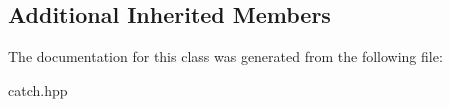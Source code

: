 \subsection*{Additional Inherited Members}


The documentation for this class was generated from the following file\+:\begin{DoxyCompactItemize}
\item 
catch.\+hpp\end{DoxyCompactItemize}
